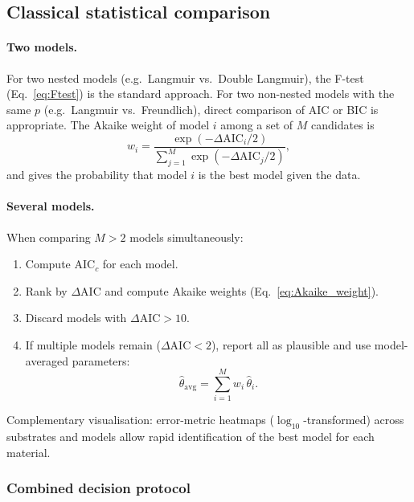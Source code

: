 	\subsection{Classical statistical comparison}

	\paragraph{Two models.}
	For two nested models (e.g.\ Langmuir vs.\ Double Langmuir),
	the F-test (Eq.~\eqref{eq:Ftest}) is the standard approach.
	For two non-nested models with the same $p$ (e.g.\ Langmuir vs.\
	Freundlich), direct comparison of AIC or BIC is appropriate.
	The Akaike weight of model $i$ among a set of $M$ candidates is
	\begin{equation}
		w_i = \frac{\exp(-\Delta\mathrm{AIC}_i / 2)}
		{\displaystyle\sum_{j=1}^{M}
			\exp(-\Delta\mathrm{AIC}_j / 2)},
		\label{eq:Akaike_weight}
	\end{equation}
	and gives the probability that model $i$ is the best model given
	the data.

	\paragraph{Several models.}
	When comparing $M > 2$ models simultaneously:
	\begin{enumerate}
		\item Compute AIC$_c$ for each model.
		\item Rank by $\Delta\mathrm{AIC}$ and compute Akaike weights
		(Eq.~\eqref{eq:Akaike_weight}).
		\item Discard models with $\Delta\mathrm{AIC} > 10$.
		\item If multiple models remain ($\Delta\mathrm{AIC} < 2$),
		report all as plausible and use model-averaged parameters:
		\begin{equation}
			\hat{\theta}_{\mathrm{avg}}
			= \sum_{i=1}^{M} w_i\,\hat{\theta}_i.
			\label{eq:model_averaging}
		\end{equation}
	\end{enumerate}
	Complementary visualisation: error-metric heatmaps
	($\log_{10}$-transformed) across substrates and models allow
	rapid identification of the best model for each material.

	\subsubsection{Combined decision protocol}

